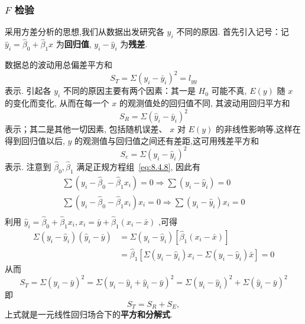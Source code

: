 \subsubsection{$F$ 检验}

采用方差分析的思想,我们从数据出发研究各 $y_i$ 不同的原因. 首先引入记号：记 $\hat{y}_i = \hat{\beta}_0 + \hat{\beta}_1 x$ 为\textbf{回归值}, $y_i - \hat{y}_i$ 为\textbf{残差}. 

数据总的波动用总偏差平方和
\begin{equation}\label{eq:8.4.10}
S_T=\Sigma ( y_i - \bar{y}_i)^2 = l_{yy} 
\end{equation}
表示. 引起各 $y_i$ 不同的原因主要有两个因素：其一是 $H_0$ 可能不真, $E(y)$ 随 $x$ 的变化而变化, 从而在每一个 $x$ 的观测值处的回归值不同, 其波动用回归平方和
\begin{equation}
S_R=\Sigma{\left( \hat{y}_i-\bar{y}_i \right)}^2 \label{eq:8.4.11}  
\end{equation}
表示；其二是其他一切因素, 包括随机误差、 $x$ 对 $E(y)$ 的非线性影响等,这样在得到回归值以后, $y$ 的观测值与回归值之间还有差距,这可用残差平方和
\begin{equation}
S_{e}=\Sigma{\left( y_i-\hat{y}_i \right)}^2  
\end{equation}
表示.
注意到 $\hat{\beta}_0, \hat{\beta}_1$ 满足正规方程组~\ref{eq:8.4.8}, 因此有
\begin{equation*}
\begin{array}{c}
\sum{\left( y_i-\hat{\beta }_0-\hat{\beta }_1x_i \right) =0\Rightarrow \sum{\left( y_i-\hat{y}_i \right)}}=0\\
\sum{\left( y_i-\hat{\beta }_0-\hat{\beta }_1x_i \right) x_i=0\Rightarrow \sum{\left( y_i-\hat{y}_i \right)}}x_i=0\\
\end{array}
\end{equation*}
利用 $\hat{y}_i=\hat{\beta }_0+\hat{\beta }_1x_i,x_i=\bar{y}+\hat{\beta }_1\left( x_i-\bar{x} \right) $ ,可得 
\begin{equation*}
\begin{aligned} 
\Sigma\left(y_{i}-\hat{y}_{i}\right)\left(\hat{y}_{i}-\bar{y}\right) &=\Sigma\left(y_{i}-\hat{y}_{i}\right)\left[\hat{\beta}_{1}\left(x_{i}-\bar{x}\right)\right] \\ &=\hat{\beta}_{1}\left[\Sigma\left(y_{i}-\hat{y}_{i}\right) x_{i}-\Sigma\left(y_{i}-\hat{y}_{i}\right) \bar{x}\right]=0 
\end{aligned}
\end{equation*}
从而
\begin{equation*}
  S_{T} = \Sigma(y_{i}-\bar{y})^{2} = \Sigma(y_{i} - \hat{y}_{i} + \hat{y}_{i} - \bar{y})^{2} = \Sigma(y_{i} - \hat{y}_{i})^{2} + \Sigma(\hat{y}_{i}-\bar{y})^{2}
\end{equation*}
即
\begin{equation}
S_T = S_R + S_E, \label{eq:8.4.13}
\end{equation}
上式就是一元线性回归场合下的\textbf{平方和分解式}.

